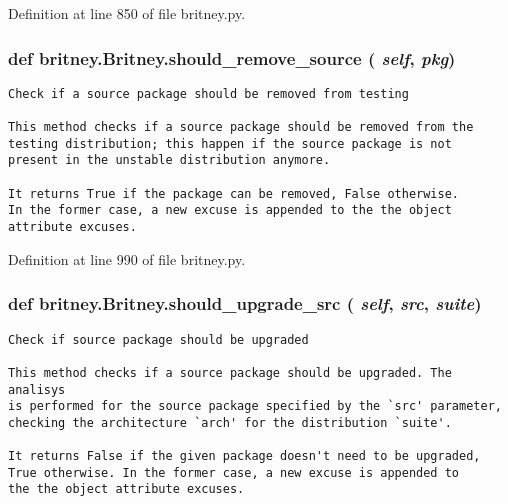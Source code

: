 Definition at line 850 of file britney.py.
\subsubsection{\setlength{\rightskip}{0pt plus 5cm}def britney.Britney.should\_\-remove\_\-source ( {\em self},  {\em pkg})}\label{classbritney_1_1Britney_f8a6c9adbdec7a5a982dd2b74febcc08}




\footnotesize\begin{verbatim}Check if a source package should be removed from testing

This method checks if a source package should be removed from the
testing distribution; this happen if the source package is not
present in the unstable distribution anymore.

It returns True if the package can be removed, False otherwise.
In the former case, a new excuse is appended to the the object
attribute excuses.
\end{verbatim}
\normalsize
 

Definition at line 990 of file britney.py.
\subsubsection{\setlength{\rightskip}{0pt plus 5cm}def britney.Britney.should\_\-upgrade\_\-src ( {\em self},  {\em src},  {\em suite})}\label{classbritney_1_1Britney_94785175a85f44b1afaf3add167a211f}




\footnotesize\begin{verbatim}Check if source package should be upgraded

This method checks if a source package should be upgraded. The analisys
is performed for the source package specified by the `src' parameter, 
checking the architecture `arch' for the distribution `suite'.
       
It returns False if the given package doesn't need to be upgraded,
True otherwise. In the former case, a new excuse is appended to
the the object attribute excuses.
\end{verbatim}
\normalsize
 

